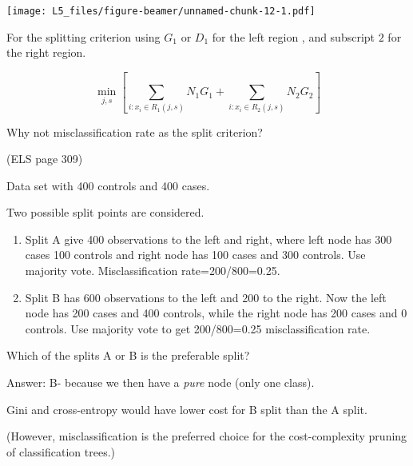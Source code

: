 \documentclass[
  ignorenonframetext,
]{beamer}
\begin{document}
\begin{frame}

\texttt{[image: L5\_files/figure-beamer/unnamed-chunk-12-1.pdf]}

\end{frame}

\begin{frame}

For the splitting criterion using \(G_1\) or \(D_1\) for the left region
, and subscript \(2\) for the right region.

\[\min_{j,s} [ \sum_{i: x_i \in R_1(j,s)} N_1G_1 + \sum_{i: x_i \in R_2(j,s)} N_2 G_2]\]

\end{frame}

\begin{frame}

\begin{block}{Why not misclassification rate as the split criterion?}

(ELS page 309)

Data set with 400 controls and 400 cases.

Two possible split points are considered.

\begin{enumerate}
[1)]
\item
  Split A give 400 observations to the left and right, where left node
  has 300 cases 100 controls and right node has 100 cases and 300
  controls. Use majority vote. Misclassification rate=200/800=0.25.
\item
  Split B has 600 observations to the left and 200 to the right. Now the
  left node has 200 cases and 400 controls, while the right node has 200
  cases and 0 controls. Use majority vote to get 200/800=0.25
  misclassification rate.
\end{enumerate}

Which of the splits A or B is the preferable split?

Answer: B- because we then have a \emph{pure} node (only one class).

Gini and cross-entropy would have lower cost for B split than the A
split.

(However, misclassification is the preferred choice for the
cost-complexity pruning of classification trees.)

\end{block}

\end{frame}
\end{document}
